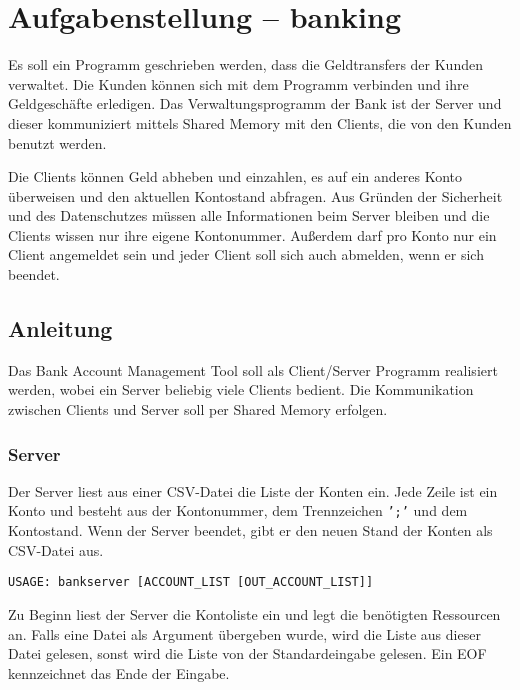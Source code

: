 




\section*{Aufgabenstellung -- banking}

Es soll ein Programm geschrieben werden, dass die Geldtransfers der Kunden
verwaltet. Die Kunden können sich mit dem Programm verbinden und ihre
Geldgeschäfte erledigen. Das Verwaltungsprogramm der Bank ist der Server und
dieser kommuniziert mittels Shared Memory mit den Clients, die von den Kunden
benutzt werden.

Die Clients können Geld abheben und einzahlen, es auf ein anderes Konto
überweisen und den aktuellen Kontostand abfragen. Aus Gründen der Sicherheit
und des Datenschutzes müssen alle Informationen beim Server bleiben und die
Clients wissen nur ihre eigene Kontonummer. Außerdem darf pro Konto nur ein
Client angemeldet sein und jeder Client soll sich auch abmelden, wenn er sich
beendet.



\subsection*{Anleitung}

Das Bank Account Management Tool soll als Client/Server Programm realisiert
werden, wobei ein Server beliebig viele Clients bedient. Die Kommunikation
zwischen Clients und Server soll per Shared Memory erfolgen.


\subsubsection*{Server}
\label{sec:server}

Der Server liest aus einer CSV-Datei die Liste der Konten ein. Jede Zeile ist
ein Konto und besteht aus der Kontonummer, dem Trennzeichen \texttt{';'} und
dem Kontostand. Wenn der Server beendet, gibt er den neuen Stand der Konten als
CSV-Datei aus.

\begin{verbatim}
USAGE: bankserver [ACCOUNT_LIST [OUT_ACCOUNT_LIST]]
\end{verbatim}

Zu Beginn liest der Server die Kontoliste ein und legt die benötigten
Ressourcen an. Falls eine Datei als Argument übergeben wurde, wird die Liste
aus dieser Datei gelesen, sonst wird die Liste von der Standardeingabe gelesen.
Ein EOF kennzeichnet das Ende der Eingabe.

